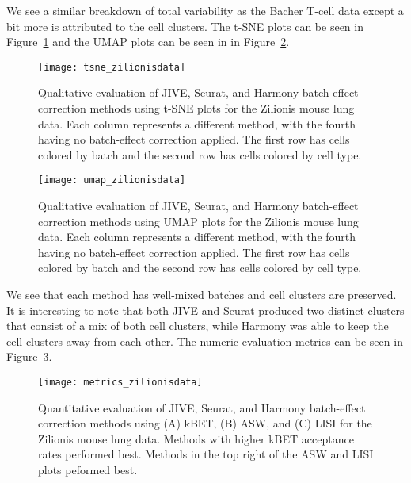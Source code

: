 \documentclass[
12pt, %
letterpaper, %
oneside, %
headinclude,footinclude, %
BCOR5mm, %
]{scrartcl}
\begin{document}
We see a similar breakdown of total variability as the Bacher T-cell data except a bit more is attributed to the cell clusters. The t-SNE plots can be seen in Figure~\ref{fig:tsne_zilionisdata} and the UMAP plots can be seen in in Figure~\ref{fig:umap_zilionisdata}.

\begin{figure}[H]
    \centering 
    \texttt{[image: tsne\_zilionisdata]} 
    \caption[t-SNE Plots for the Zilionis Mouse Lung Data]{Qualitative evaluation of JIVE, Seurat, and Harmony batch-effect correction methods using t-SNE plots for the Zilionis mouse lung data. Each column represents a different method, with the fourth having no batch-effect correction applied. The first row has cells colored by batch and the second row has cells colored by cell type.}
    \label{fig:tsne_zilionisdata}
\end{figure}

\begin{figure}[H]
    \centering 
    \texttt{[image: umap\_zilionisdata]} 
    \caption[UMAP Plots for the Zilionis Mouse Lung Data]{Qualitative evaluation of JIVE, Seurat, and Harmony batch-effect correction methods using UMAP plots for the Zilionis mouse lung data. Each column represents a different method, with the fourth having no batch-effect correction applied. The first row has cells colored by batch and the second row has cells colored by cell type.}
    \label{fig:umap_zilionisdata} 
\end{figure}

We see that each method has well-mixed batches and cell clusters are preserved. It is interesting to note that both JIVE and Seurat produced two distinct clusters that consist of a mix of both cell clusters, while Harmony was able to keep the cell clusters away from each other. The numeric evaluation metrics can be seen in Figure~\ref{fig:metrics_zilionisdata}.

\begin{figure}[H]
    \centering 
    \texttt{[image: metrics\_zilionisdata]} 
    \caption[Metrics for the Zilionis Mouse Lung Data]{Quantitative evaluation of JIVE, Seurat, and Harmony batch-effect correction methods using (A) kBET, (B) ASW, and (C) LISI for the Zilionis mouse lung data. Methods with higher kBET acceptance rates performed best. Methods in the top right of the ASW and LISI plots peformed best.}
    \label{fig:metrics_zilionisdata} 
\end{figure}
\end{document}
